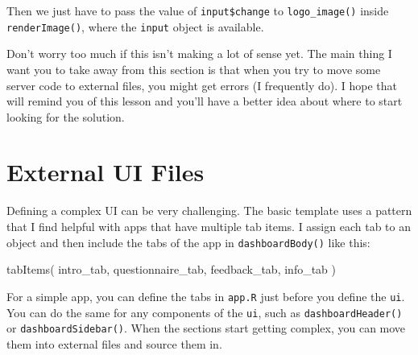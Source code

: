 \documentclass[
]{book}
\newenvironment{Shaded}{\begin{snugshade}}{\end{snugshade}}
\newcommand{\AttributeTok}[1]{\textcolor[rgb]{0.77,0.63,0.00}{#1}}
\newcommand{\ConstantTok}[1]{\textcolor[rgb]{0.00,0.00,0.00}{#1}}
\newcommand{\ControlFlowTok}[1]{\textcolor[rgb]{0.13,0.29,0.53}{\textbf{#1}}}
\newcommand{\FunctionTok}[1]{\textcolor[rgb]{0.00,0.00,0.00}{#1}}
\newcommand{\NormalTok}[1]{#1}
\newcommand{\OtherTok}[1]{\textcolor[rgb]{0.56,0.35,0.01}{#1}}
\newcommand{\SpecialCharTok}[1]{\textcolor[rgb]{0.00,0.00,0.00}{#1}}
\begin{document}
Then we just have to pass the value of \texttt{input\$change} to \texttt{logo\_image()} inside \texttt{renderImage()}, where the \texttt{input} object is available.

\begin{Shaded}
\end{Shaded}

Don't worry too much if this isn't making a lot of sense yet. The main thing I want you to take away from this section is that when you try to move some server code to external files, you might get errors (I frequently do). I hope that will remind you of this lesson and you'll have a better idea about where to start looking for the solution.

\hypertarget{external-ui-files}{%
\section{External UI Files}\label{external-ui-files}}

Defining a complex UI can be very challenging. The basic template uses a pattern that I find helpful with apps that have multiple tab items. I assign each tab to an object and then include the tabs of the app in \texttt{dashboardBody()} like this:

\begin{Shaded}
\begin{Highlighting}[]
\FunctionTok{tabItems}\NormalTok{(}
\NormalTok{    intro\_tab,}
\NormalTok{    questionnaire\_tab,}
\NormalTok{    feedback\_tab,}
\NormalTok{    info\_tab}
\NormalTok{)}
\end{Highlighting}
\end{Shaded}

For a simple app, you can define the tabs in \texttt{app.R} just before you define the \texttt{ui}. You can do the same for any components of the \texttt{ui}, such as \texttt{dashboardHeader()} or \texttt{dashboardSidebar()}. When the sections start getting complex, you can move them into external files and source them in.
\end{document}
